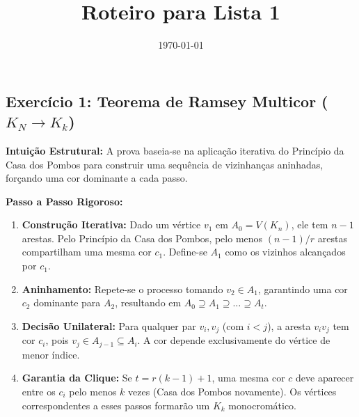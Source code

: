 \documentclass[11pt, a4paper]{article}
\title{\textbf{Roteiro para Lista 1}}
\date{\today}
\begin{document}
\maketitle

\subsection*{Exercício 1: Teorema de Ramsey Multicor ($K_N \to K_k$)}
\textbf{Intuição Estrutural:} A prova baseia-se na aplicação iterativa do Princípio da Casa dos Pombos para construir uma sequência de vizinhanças aninhadas, forçando uma cor dominante a cada passo.

\textbf{Passo a Passo Rigoroso:}
\begin{enumerate}
    \item \textbf{Construção Iterativa:} Dado um vértice $v_1$ em $A_0 = V(K_n)$, ele tem $n-1$ arestas. Pelo Princípio da Casa dos Pombos, pelo menos $(n-1)/r$ arestas compartilham uma mesma cor $c_1$. Define-se $A_1$ como os vizinhos alcançados por $c_1$.
    \item \textbf{Aninhamento:} Repete-se o processo tomando $v_2 \in A_1$, garantindo uma cor $c_2$ dominante para $A_2$, resultando em $A_0 \supseteq A_1 \supseteq \dots \supseteq A_t$.
    \item \textbf{Decisão Unilateral:} Para qualquer par $v_i, v_j$ (com $i < j$), a aresta $v_iv_j$ tem cor $c_i$, pois $v_j \in A_{j-1} \subseteq A_i$. A cor depende exclusivamente do vértice de menor índice.
    \item \textbf{Garantia da Clique:} Se $t = r(k-1)+1$, uma mesma cor $c$ deve aparecer entre os $c_i$ pelo menos $k$ vezes (Casa dos Pombos novamente). Os vértices correspondentes a esses passos formarão um $K_k$ monocromático.
\end{enumerate}
\end{document}
